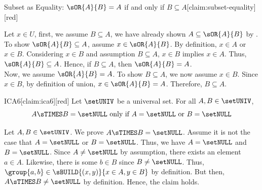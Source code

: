 \begin{define}{Subset as Equality: $\sOR{A}{B}=A$ if and only if $B\subseteq A$}[claim:subset-equality][red]
  \begin{subprove}[red]
      Let $x\in U$, first, we assume $B\subseteq A$, we have already shown
      $A \subseteq \sOR{A}{B}$ by .
      To show $\sOR{A}{B} \subseteq A$, assume $x\in \sOR{A}{B}$.
      By definition, $x\in A$ or $x\in B$. Considering $x\in B$ and assumption
      $B \subseteq A$, $x\in B$ implies $x\in A$. Thus, $\sOR{A}{B} \subseteq A$.
      Hence, if $B\subseteq A$, then $\sOR{A}{B} = A$. \vspace*{10px}\\
      Now, we assume $\sOR{A}{B}=A$. To show $B\subseteq A$, we now assume $x\in B$. Since $x\in B$, by definition
      of union, $x\in \sOR{A}{B} = A$. Therefore, $B\subseteq A$.
  \end{subprove}
\end{define}


\begin{define}{ICA6}[claim:ica6][red]
  Let $\setUNIV$ be a universal set. For all $A,B\in\setUNIV$, $$A\sTIMES B =\setNULL\text{ only if } A=\setNULL\text{ or } B=\setNULL$$
  \begin{subprove}[red]
    Let $A,B\in\setUNIV$. We prove $A\sTIMES B=\setNULL$. Assume it is not the case that 
    $A=\setNULL$ or $B=\setNULL$. Thus, we have $A=\setNULL$ and $B=\setNULL$. 
    Since $A\ne\setNULL$ by assumption, there exists an element $a\in A$. Likewise, there 
    is some $b\in B$ since $B\ne\setNULL$. Thus, $\group{a,b}\in\sBUILD{(x,y)}{x\in A,y\in B}$ 
    by definition. But then, $A\sTIMES B\ne\setNULL$ by definition. Hence, the claim holds. 
  \end{subprove}
\end{define}

